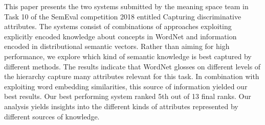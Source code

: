 This paper presents the two systems submitted by the meaning space team in Task 10 of the SemEval competition 2018 entitled Capturing discriminative attributes. The systems consist of combinations of approaches exploiting explicitly encoded knowledge about concepts in WordNet and information encoded in distributional semantic vectors. Rather than aiming for high performance, we explore which kind of semantic knowledge is best captured by different methods. The results indicate that WordNet glosses on different levels of the hierarchy capture many attributes relevant for this task. In combination with exploiting word embedding similarities, this source of information yielded our best results. Our best performing system ranked 5th out of 13 final ranks. Our analysis yields insights into the different kinds of attributes represented by different sources of knowledge.
